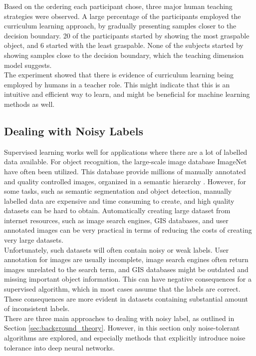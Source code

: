 Based on the ordering each participant chose, three major human teaching strategies were observed. A large percentage of the participants employed the curriculum learning approach, by gradually presenting samples closer to the decision boundary. 20 of the participants started by showing the most graspable object, and 6 started with the least graspable.  None of the subjects started by showing samples close to the decision boundary, which the teaching dimension model suggests.\\

The experiment showed that there is evidence of curriculum learning being employed by humans in a teacher role. This might indicate that this is an intuitive and efficient way to learn, and might be beneficial for machine learning methods as well. \\


\subsection{Dealing with Noisy Labels}
Supervised learning works well for applications where there are a lot of labelled data available. For object recognition, the large-scale image database ImageNet have often been utilized. This database provide millions of manually annotated and quality controlled images, organized in a semantic hierarchy \citep{Deng_imagenet}. However, for some tasks, such as semantic segmentation and object detection, manually labelled data are expensive and time consuming to create, and high quality datasets can be hard to obtain. Automatically creating large dataset from internet resources, such as image search engines, \ac{GIS} databases, and user annotated images can be very practical in terms of reducing the costs of creating very large datasets. \\

Unfortunately, such datasets will often contain noisy or weak labels. User annotation for images are usually incomplete, image search engines often return images unrelated to the search term, and \ac{GIS} databases might be outdated and missing important object information. This can have negative consequences for a supervised algorithm, which in most cases assume that the labels are correct. These consequences are more evident in datasets containing substantial amount of inconsistent labels.\\
 
There are three main approaches to dealing with noisy label, as outlined in Section \ref{sec:background_theory}. However, in this section only noise-tolerant algorithms are explored, and especially methods that explicitly introduce noise tolerance into deep neural networks.  

